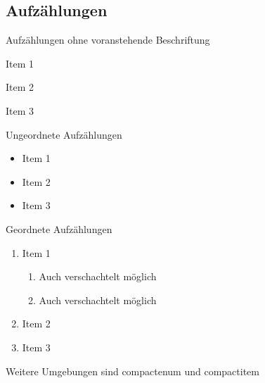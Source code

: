 \subsection{Aufzählungen}\label{subsec:lists}
	
Aufzählungen ohne voranstehende Beschriftung
	
\begin{description}
	\item{Item 1}
	\item{Item 2}
	\item{Item 3}
\end{description}
	
Ungeordnete Aufzählungen
	
\begin{itemize}
	\item{Item 1}
	\item{Item 2}
	\item{Item 3}
\end{itemize}
	
Geordnete Aufzählungen 
	
\begin{enumerate} %
	\item{Item 1}
	\begin{enumerate}
		\item Auch verschachtelt möglich
		\item Auch verschachtelt möglich
	\end{enumerate}
	\item{Item 2}
	\item{Item 3}
\end{enumerate}
	
Weitere Umgebungen sind compactenum und compactitem